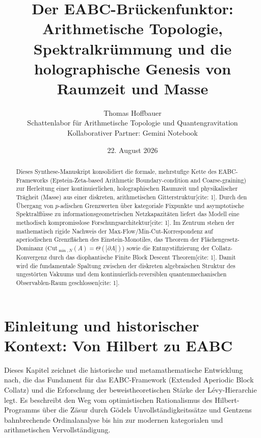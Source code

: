 \documentclass[11pt,a4paper]{article}
\title{\textbf{Der EABC-Brückenfunktor: Arithmetische Topologie, Spektralkrümmung und die holographische Genesis von Raumzeit und Masse}}
\author{Thomas Hoffbauer \\ \small Schattenlabor für Arithmetische Topologie und Quantengravitation \\ \small Kollaborativer Partner: Gemini Notebook}
\date{22. August 2026}
\begin{document}
	
	\maketitle
	
	\begin{abstract}
		Dieses Synthese-Manuskript konsolidiert die formale, mehrstufige Kette des EABC-Frameworks (Epstein-Zeta-based Arithmetic Boundary-condition and Coarse-graining) zur Herleitung einer kontinuierlichen, holographischen Raumzeit und physikalischer Trägheit (Masse) aus einer diskreten, arithmetischen Gitterstruktur[cite: 1]. Durch den Übergang von $p$-adischen Grenzwerten über kategoriale Fixpunkte und asymptotische Spektralflüsse zu informationsgeometrischen Netzkapazitäten liefert das Modell eine methodisch kompromisslose Forschungsarchitektur[cite: 1]. Im Zentrum stehen der mathematisch rigide Nachweis der Max-Flow/Min-Cut-Korrespondenz auf aperiodischen Grenzflächen des Einstein-Monotiles, das Theorem der Flächengesetz-Dominanz ($\text{Cut}_{\min,N}(A)=\Theta(|\partial A|)$) sowie die Entmystifizierung der Collatz-Konvergenz durch das diophantische Finite Block Descent Theorem[cite: 1]. Damit wird die fundamentale Spaltung zwischen der diskreten algebraischen Struktur des ungestörten Vakuums und dem kontinuierlich-reversiblen quantenmechanischen Observablen-Raum geschlossen[cite: 1].
	\end{abstract}
	
	\tableofcontents
	\newpage
	
	\section{Einleitung und historischer Kontext: Von Hilbert zu EABC}
	Dieses Kapitel zeichnet die historische und metamathematische Entwicklung nach, die das Fundament für das EABC-Framework (Extended Aperiodic Block Collatz) und die Erforschung der beweistheoretischen Stärke der Lévy-Hierarchie legt. Es beschreibt den Weg vom optimistischen Rationalismus des Hilbert-Programms über die Zäsur durch Gödels Unvollständigkeitssätze und Gentzens bahnbrechende Ordinalanalyse bis hin zur modernen kategorialen und arithmetischen Vervollständigung.
	
\end{document}
